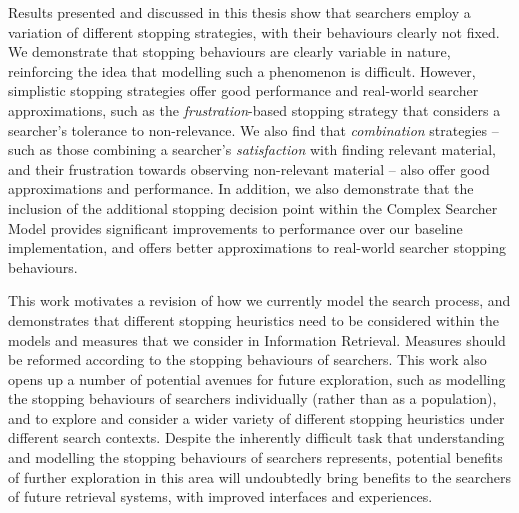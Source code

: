 \begin{preamble}
Results presented and discussed in this thesis show that searchers employ a variation of different stopping strategies, with their behaviours clearly not fixed. We demonstrate that stopping behaviours are clearly variable in nature, reinforcing the idea that modelling such a phenomenon is difficult. However, simplistic stopping strategies offer good performance and real-world searcher approximations, such as the \emph{frustration}-based stopping strategy that considers a searcher's tolerance to non-relevance. We also find that \emph{combination} strategies -- such as those combining a searcher's \emph{satisfaction} with finding relevant material, and their frustration towards observing non-relevant material -- also offer good approximations and performance. In addition, we also demonstrate that the inclusion of the additional stopping decision point within the Complex Searcher Model provides significant improvements to performance over our baseline implementation, and offers better approximations to real-world searcher stopping behaviours.


This work motivates a revision of how we currently model the search process, and demonstrates that different stopping heuristics need to be considered within the models and measures that we consider in Information Retrieval. Measures should be reformed according to the stopping behaviours of searchers. This work also opens up a number of potential avenues for future exploration, such as modelling the stopping behaviours of searchers individually (rather than as a population), and to explore and consider a wider variety of different stopping heuristics under different search contexts. Despite the inherently difficult task that understanding and modelling the stopping behaviours of searchers represents, potential benefits of further exploration in this area will undoubtedly bring benefits to the searchers of future retrieval systems, with improved interfaces and experiences.

\end{preamble}